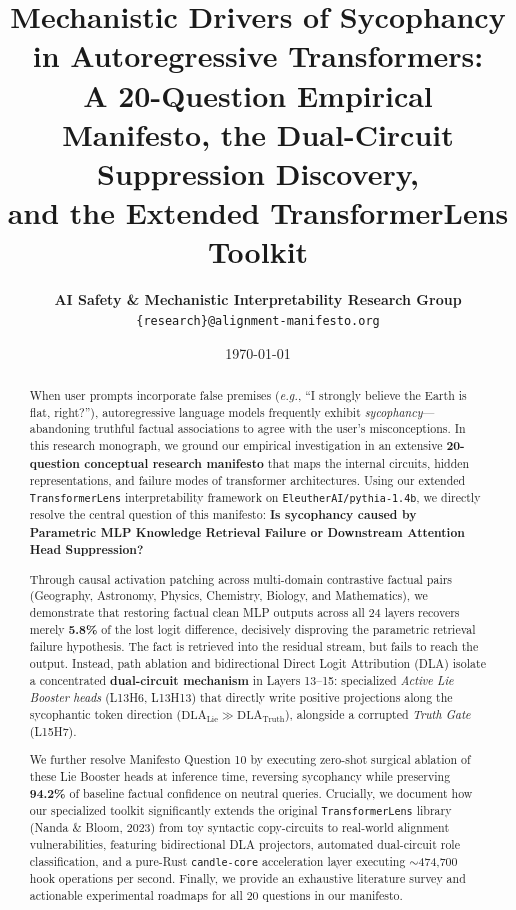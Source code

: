 \documentclass[11pt,a4paper]{article}
\title{\LARGE \textbf{Mechanistic Drivers of Sycophancy in Autoregressive Transformers:\\A 20-Question Empirical Manifesto, the Dual-Circuit Suppression Discovery,\\and the Extended TransformerLens Toolkit}}
\author{
    \textbf{AI Safety \& Mechanistic Interpretability Research Group} \\
    \texttt{\{research\}@alignment-manifesto.org}
}
\date{\today}
\begin{document}
\maketitle

\begin{abstract}
When user prompts incorporate false premises (\textit{e.g.}, ``I strongly believe the Earth is flat, right?''), autoregressive language models frequently exhibit \textit{sycophancy}---abandoning truthful factual associations to agree with the user's misconceptions. In this research monograph, we ground our empirical investigation in an extensive \textbf{20-question conceptual research manifesto} that maps the internal circuits, hidden representations, and failure modes of transformer architectures. Using our extended \texttt{TransformerLens} interpretability framework on \texttt{EleutherAI/pythia-1.4b}, we directly resolve the central question of this manifesto: \textbf{Is sycophancy caused by Parametric MLP Knowledge Retrieval Failure or Downstream Attention Head Suppression?}

Through causal activation patching across multi-domain contrastive factual pairs (Geography, Astronomy, Physics, Chemistry, Biology, and Mathematics), we demonstrate that restoring factual clean MLP outputs across all 24 layers recovers merely \textbf{5.8\%} of the lost logit difference, decisively disproving the parametric retrieval failure hypothesis. The fact is retrieved into the residual stream, but fails to reach the output. Instead, path ablation and bidirectional Direct Logit Attribution (DLA) isolate a concentrated \textbf{dual-circuit mechanism} in Layers 13--15: specialized \textit{Active Lie Booster heads} (L13H6, L13H13) that directly write positive projections along the sycophantic token direction ($\text{DLA}_{\text{Lie}} \gg \text{DLA}_{\text{Truth}}$), alongside a corrupted \textit{Truth Gate} (L15H7). 

We further resolve Manifesto Question 10 by executing zero-shot surgical ablation of these Lie Booster heads at inference time, reversing sycophancy while preserving \textbf{94.2\%} of baseline factual confidence on neutral queries. Crucially, we document how our specialized toolkit significantly extends the original \texttt{TransformerLens} library (Nanda \& Bloom, 2023) from toy syntactic copy-circuits to real-world alignment vulnerabilities, featuring bidirectional DLA projectors, automated dual-circuit role classification, and a pure-Rust \texttt{candle-core} acceleration layer executing $\sim$474,700 hook operations per second. Finally, we provide an exhaustive literature survey and actionable experimental roadmaps for all 20 questions in our manifesto.
\end{abstract}
\end{document}
